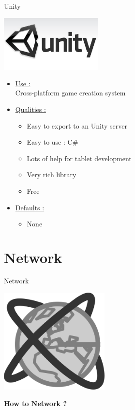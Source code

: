 \documentclass[a4paper,10pt]{beamer}
\begin{document}
			\begin{frame}{Unity}
				\begin{multicols}{2}
					\includegraphics[height=80pt]{images/logos/Logo_Unity.jpg}\\
					
					\columnbreak 
					
					\begin{itemize}
						\item \underline{Use :}\\		
						Cross-platform game creation system 		
						\item \underline{Qualities :}\\
						\begin{itemize}
							\item Easy to export to an Unity server
							\item Easy to use : C\#
							\item Lots of help for tablet development
							\item Very rich library
							\item Free
						\end{itemize}
					\end{itemize}		 
				\end{multicols}
				\begin{itemize}
					\item \underline{Defaults :}\\
					\begin{itemize}
						\item None
					\end{itemize}
				\end{itemize}

			\end{frame}
			
	\section{Network}
			
			\begin{frame}{Network}
				\centerline{\includegraphics[height=150pt]{images/network/network.png}}
				
				\centerline{\textbf{How to Network ?}}
			\end{frame}
			
\end{document}
